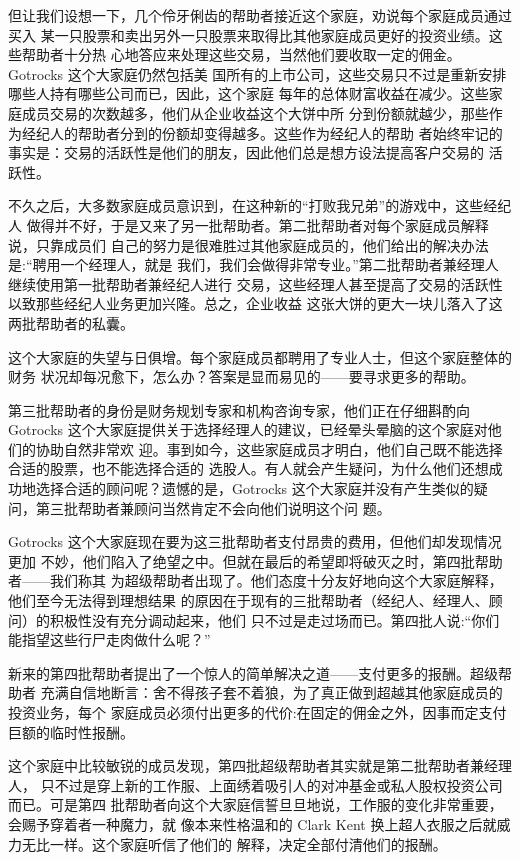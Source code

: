 \documentclass[UTF8,a4paper,zihao=-4,fontset = windows]{ctexart} %
\begin{document}
但让我们设想一下，几个伶牙俐齿的帮助者接近这个家庭，劝说每个家庭成员通过买入
某一只股票和卖出另外一只股票来取得比其他家庭成员更好的投资业绩。这些帮助者十分热
心地答应来处理这些交易，当然他们要收取一定的佣金。Gotrocks 这个大家庭仍然包括美
国所有的上市公司，这些交易只不过是重新安排哪些人持有哪些公司而已，因此，这个家庭
每年的总体财富收益在减少。这些家庭成员交易的次数越多，他们从企业收益这个大饼中所
分到份额就越少，那些作为经纪人的帮助者分到的份额却变得越多。这些作为经纪人的帮助
者始终牢记的事实是：交易的活跃性是他们的朋友，因此他们总是想方设法提高客户交易的
活跃性。

不久之后，大多数家庭成员意识到，在这种新的“打败我兄弟”的游戏中，这些经纪人
做得并不好，于是又来了另一批帮助者。第二批帮助者对每个家庭成员解释说，只靠成员们
自己的努力是很难胜过其他家庭成员的，他们给出的解决办法是:“聘用一个经理人，就是
我们，我们会做得非常专业。”第二批帮助者兼经理人继续使用第一批帮助者兼经纪人进行
交易，这些经理人甚至提高了交易的活跃性以致那些经纪人业务更加兴隆。总之，企业收益
这张大饼的更大一块儿落入了这两批帮助者的私囊。

这个大家庭的失望与日俱增。每个家庭成员都聘用了专业人士，但这个家庭整体的财务
状况却每况愈下，怎么办？答案是显而易见的——要寻求更多的帮助。

第三批帮助者的身份是财务规划专家和机构咨询专家，他们正在仔细斟酌向 Gotrocks
这个大家庭提供关于选择经理人的建议，已经晕头晕脑的这个家庭对他们的协助自然非常欢
迎。事到如今，这些家庭成员才明白，他们自己既不能选择合适的股票，也不能选择合适的
选股人。有人就会产生疑问，为什么他们还想成功地选择合适的顾问呢？遗憾的是，Gotrocks
这个大家庭并没有产生类似的疑问，第三批帮助者兼顾问当然肯定不会向他们说明这个问
题。

Gotrocks 这个大家庭现在要为这三批帮助者支付昂贵的费用，但他们却发现情况更加
不妙，他们陷入了绝望之中。但就在最后的希望即将破灭之时，第四批帮助者——我们称其
为超级帮助者出现了。他们态度十分友好地向这个大家庭解释，他们至今无法得到理想结果
的原因在于现有的三批帮助者（经纪人、经理人、顾问）的积极性没有充分调动起来，他们
只不过是走过场而已。第四批人说:“你们能指望这些行尸走肉做什么呢？”

新来的第四批帮助者提出了一个惊人的简单解决之道——支付更多的报酬。超级帮助者
充满自信地断言：舍不得孩子套不着狼，为了真正做到超越其他家庭成员的投资业务，每个
家庭成员必须付出更多的代价:在固定的佣金之外，因事而定支付巨额的临时性报酬。

这个家庭中比较敏锐的成员发现，第四批超级帮助者其实就是第二批帮助者兼经理人，
只不过是穿上新的工作服、上面绣着吸引人的对冲基金或私人股权投资公司而已。可是第四
批帮助者向这个大家庭信誓旦旦地说，工作服的变化非常重要，会赐予穿着者一种魔力，就
像本来性格温和的 Clark Kent 换上超人衣服之后就威力无比一样。这个家庭听信了他们的
解释，决定全部付清他们的报酬。
\end{document}
